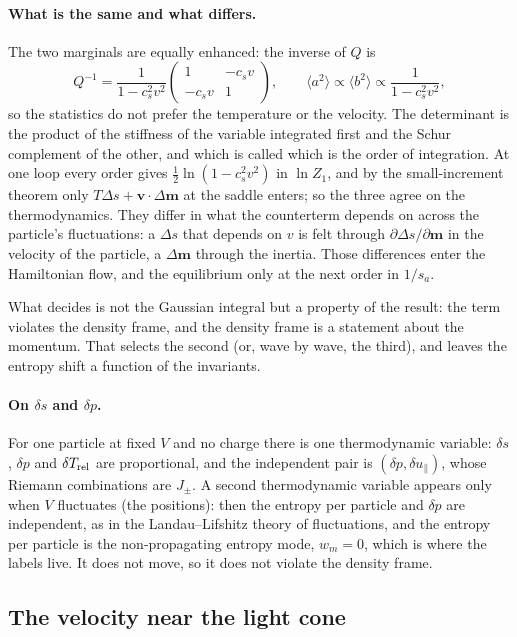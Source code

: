 \documentclass[11pt,aps,preprint,nofootinbib,superscriptaddress,tightenlines]{revtex4-2}
\newcommand{\avg}[1]{\langle #1\rangle}
\def\st{\begin{equation}}
\def\stp{\end{equation}}
\let\oldparagraph\paragraph
\renewcommand{\paragraph}{\par\bigskip\oldparagraph}
\begin{document}
\paragraph{What is the same and what differs.}  The two marginals are equally enhanced: the inverse of $Q$ is
\st
Q^{-1}=\frac1{1-c_s^2v^2}\begin{pmatrix}1&-c_sv\\-c_sv&1\end{pmatrix},\qquad \avg{a^2}\propto\avg{b^2}\propto\frac1{1-c_s^2v^2} ,
\stp
so the statistics do not prefer the temperature or the velocity.  The determinant is the product of the stiffness of the variable integrated first and the Schur
complement of the other, and which is called which is the order of integration.  At one loop every order gives $\tfrac12\ln(1-c_s^2v^2)$ in $\ln Z_1$, and by the
small-increment theorem only $T\Delta s+\bm v\cdot\Delta\bm m$ at the saddle enters; so the three agree on the thermodynamics.  They differ in what the counterterm depends
on across the particle's fluctuations: a $\Delta s$ that depends on $v$ is felt through $\partial\Delta s/\partial\bm m$ in the velocity of the particle, a $\Delta\bm m$
through the inertia.  Those differences enter the Hamiltonian flow, and the equilibrium only at the next order in $1/s_a$.

What decides is not the Gaussian integral but a property of the result: the term violates the density frame, and the density frame is a statement about the momentum.
That selects the second (or, wave by wave, the third), and leaves the entropy shift a function of the invariants.

\paragraph{On $\delta s$ and $\delta p$.}  For one particle at fixed $V$ and no charge there is one thermodynamic variable: $\delta s$, $\delta p$ and $\delta T_{\rm rel}$ are
proportional, and the independent pair is $(\delta p,\delta u_\parallel)$, whose Riemann combinations are $J_\pm$.  A second thermodynamic variable appears only when $V$
fluctuates (the positions): then the entropy per particle and $\delta p$ are independent, as in the Landau--Lifshitz theory of fluctuations, and the entropy per particle is
the non-propagating entropy mode, $w_m=0$, which is where the labels live.  It does not move, so it does not violate the density frame.

\subsection{The velocity near the light cone}
\label{app:velocity}
\end{document}
